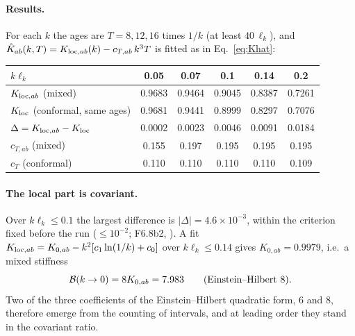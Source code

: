 \paragraph{Results.} For each $k$ the ages are $T=8,12,16$ times $1/k$ (at least $40\,\ell_k$), and
$\hat K_{ab}(k,T)=K_{{\rm loc},ab}(k)-c_{T,ab}\,k^3T$ is fitted as in Eq.~\eqref{eq:Khat}:
\begin{center}
\begin{tabular}{lccccc}
\toprule
$k\ell_k$ & 0.05 & 0.07 & 0.1 & 0.14 & 0.2\\
\midrule
$K_{{\rm loc},ab}$ (mixed) & 0.9683 & 0.9464 & 0.9045 & 0.8387 & 0.7261\\
$K_{\rm loc}$ (conformal, same ages) & 0.9681 & 0.9441 & 0.8999 & 0.8297 & 0.7076\\
$\Delta=K_{{\rm loc},ab}-K_{\rm loc}$ & 0.0002 & 0.0023 & 0.0046 & 0.0091 & 0.0184\\
$c_{T,ab}$ (mixed) & 0.155 & 0.197 & 0.195 & 0.195 & 0.195\\
$c_T$ (conformal) & 0.110 & 0.110 & 0.110 & 0.110 & 0.109\\
\bottomrule
\end{tabular}
\end{center}

\paragraph{The local part is covariant.} Over $k\ell_k\le0.1$ the largest difference is
$|\Delta|=4.6\times10^{-3}$, within the criterion fixed before the run ($\le10^{-2}$; F6.8b2,
). A fit $K_{{\rm loc},ab}=K_{0,ab}-k^2[c_1\ln(1/k)+c_0]$ over $k\ell_k\le0.14$ gives
$K_{0,ab}=0.9979$, i.e.\ a mixed stiffness
\begin{equation}
  \mathcal{B}(k\to0)=8K_{0,ab}=7.983\qquad(\text{Einstein--Hilbert }8).
\end{equation}
Two of the three coefficients of the Einstein--Hilbert quadratic form, $6$ and $8$, therefore emerge from
the counting of intervals, and at leading order they stand in the covariant ratio.

